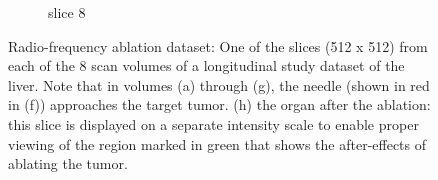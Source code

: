 \documentclass[journal]{IEEEtran}
\begin{document}
\begin{figure}[h!]
\begin{subfigure}[b]{0.24\linewidth}
 \caption{slice 8}
    \end{subfigure}     
     \caption{Radio-frequency ablation dataset: One of the slices (512 x 512) from each of the 8 scan volumes of a longitudinal study dataset of the liver. Note that in volumes (a) through (g), the needle (shown in red in (f)) approaches the target tumor. (h) the organ after the ablation: this slice is displayed on a separate intensity scale to enable proper viewing of the region marked in green that shows the after-effects of ablating the tumor.} 
\label{fig:RFA2_test_object-prior}
\end{figure}

\begin{figure}[!h]
\centering
{}\hfill
{}\hfill
{}\hfill
{}

\end{figure}
\end{document}
